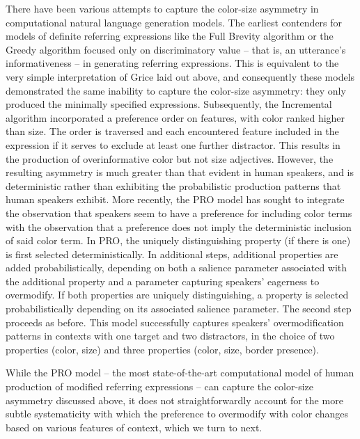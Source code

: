 \documentclass[11pt]{article}
\begin{document}
There have been various attempts to capture the color-size asymmetry in computational natural language generation models. The earliest contenders for models of definite referring expressions like the Full Brevity algorithm \cite{Dale1989} or the Greedy algorithm \cite{Dale1989} focused only on discriminatory value -- that is, an utterance's informativeness -- in generating referring expressions. This is equivalent to the very simple interpretation of Grice laid out above, and consequently these models demonstrated the same inability to capture the color-size asymmetry: they only produced the minimally specified expressions. Subsequently, the Incremental algorithm \cite{dale1995} incorporated a preference order on features, with color ranked higher than size. The order is traversed and each encountered feature included in the expression if it serves to exclude at least one further distractor. This results in the production of overinformative color but not size adjectives. However, the resulting asymmetry is much greater than that evident in human speakers, and is deterministic rather than exhibiting the probabilistic production patterns that human speakers exhibit. More recently, the PRO model \cite{VanGompel2019} has sought to integrate the observation that speakers seem to have a preference for including color terms with the observation that a preference does not imply the deterministic inclusion of said color term. In PRO, the uniquely distinguishing property (if there is one) is  first selected deterministically. In additional steps, additional properties are added probabilistically, depending on both a salience parameter associated with the additional property and a parameter capturing speakers' eagerness to overmodify. If both properties are uniquely distinguishing, a property is selected probabilistically depending on its associated salience parameter. The second step proceeds as before. This model successfully captures speakers' overmodification patterns in contexts with one target and two distractors, in the choice of two properties (color, size) and three properties (color, size, border presence).

While the PRO model -- the most state-of-the-art computational model of human production of modified referring expressions -- can capture the color-size asymmetry discussed above, it does not straightforwardly  account for the more subtle systematicity with which the preference to overmodify with color changes based on various features of context, which we turn to next. 
\end{document}

